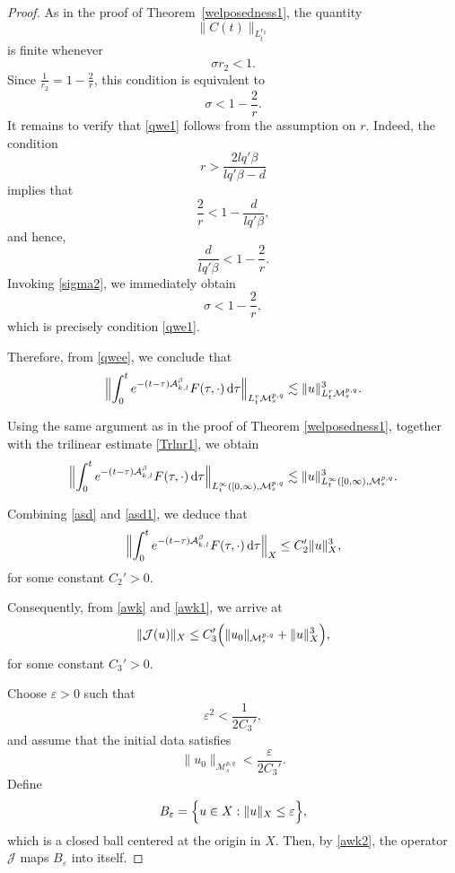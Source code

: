 \documentclass[10pt,a4paper]{amsart}
\def \Ad{\mathcal{A}_{k,l}}
\def\M{\mathcal{M}}
\begin{document}
\begin{proof}
As in the proof of Theorem~\ref{welposedness1}, the quantity
\[
\|C(t)\|_{L^{r_{2}}_{t}}
\]
is finite whenever
\[
\sigma r_{2}<1.
\]
Since \(\frac{1}{r_{2}}=1-\frac{2}{r}\), this condition is equivalent to
\begin{equation}
\label{qwe1}
\sigma
<
1-\frac{2}{r}.
\end{equation}
It remains to verify that \eqref{qwe1} follows from the assumption on \(r\). Indeed, the condition
\[
r>
\frac{2lq'\beta}{lq'\beta-d}
\]
implies that
\[
\frac{2}{r}
<
1-\frac{d}{lq'\beta},
\]
and hence,
\[
\frac{d}{lq'\beta}
<
1-\frac{2}{r}.
\]
Invoking \eqref{sigma2}, we immediately obtain
\[
\sigma
<
1-\frac{2}{r},
\]
which is precisely condition \eqref{qwe1}.

Therefore, from \eqref{qwee}, we conclude that
\begin{align}
\label{asd}
\Bigl\|
\int_{0}^{t}
e^{-(t-\tau)\Ad^{\beta}}
F(\tau,\cdot)\,\mathrm{d}\tau
\Bigr\|_{L^{r}_{t}\M^{p,q}_{s}}
\lesssim
\|u\|_{L^{r}_{t}\M^{p,q}_{s}}^{3}.
\end{align}


Using the same argument as in the proof of Theorem
\ref{welposedness1}, together with the trilinear estimate
\eqref{Trlnr1}, we obtain
\begin{align}
\label{asd1}
\Bigl\|
\int_{0}^{t}
e^{-(t-\tau)\Ad^{\beta}}
F(\tau,\cdot)\,\mathrm{d}\tau
\Bigr\|_{L^{\infty}_{t}([0,\infty),\M^{p,q}_{s}}
\lesssim
\|u\|^{3}_{L^{\infty}_{t}([0,\infty),\M^{p,q}_{s}}.
\end{align}

Combining \eqref{asd} and \eqref{asd1}, we deduce that
\begin{align}
\label{awk1}
\Bigl\|
\int_{0}^{t}
e^{-(t-\tau)\Ad^{\beta}}
F(\tau,\cdot)\,\mathrm{d}\tau
\Bigr\|_{X}
\leq
C_{2}'\|u\|_{X}^{3},
\end{align}
for some constant $C_{2}'>0$.

Consequently, from \eqref{awk} and \eqref{awk1}, we arrive at
\begin{align}
\label{awk2}
\|\mathcal{J}(u)\|_{X}
\leq
C_{3}'
\Bigl(
\|u_{0}\|_{\M^{p,q}_{s}}
+
\|u\|_{X}^{3}
\Bigr),
\end{align}
for some constant $C_{3}'>0$.

Choose $\varepsilon>0$ such that
\[
\varepsilon^{2}
<
\frac{1}{2C_{3}'},
\]
and assume that the initial data satisfies
\[
\|u_{0}\|_{\M^{p,q}_{s}}
<
\frac{\varepsilon}{2C_{3}'}.
\]
Define
\[
B_{\varepsilon}
=
\Bigl\{
u\in X
:
\|u\|_{X}\leq \varepsilon
\Bigr\},
\]
which is a closed ball centered at the origin in $X$.
Then, by \eqref{awk2}, the operator $\mathcal{J}$ maps
$B_{\varepsilon}$ into itself.


\end{proof}
\end{document}
